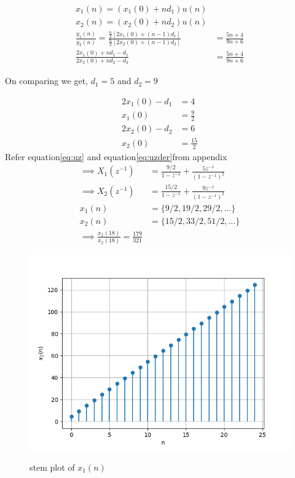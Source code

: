 \documentclass[a4,12pt,onecolumn]{IEEEtran}
\begin{document}
\begin{align}
x_1(n)=(x_1(0)+nd_1)u(n)
\label{ncert_11.9.2.9:1}\\
x_2(n)=(x_2(0)+nd_2)u(n)
\label{ncert_11.9.2.9:2}\\
\frac{y_1(n)}{y_2(n)}=\frac{\frac{n}{2}\left[ 2x_1(0) +(n-1)d_1 \right]}{\frac{n}{2}\left[ 2x_2(0) +(n-1)d_2 \right]}&= \frac{5n+4}{9n+6}\\
\frac{2x_1(0) +nd_1-d_1}{2x_2(0) +nd_2-d_2 }&= \frac{5n+4}{9n+6}
\end{align}
\begin{center}
On comparing we get, $ d_1 = 5 $ and $ d_2 = 9$ \\
\end{center}
\begin{align}
2x_1(0) - d_1 &= 4\\
x_1(0) &=\frac{9}{2}\\
2x_2(0)- d_2&=6\\
x_2(0) &=\frac{15}{2}
\end{align}
Refer equation\eqref{eq:uz}  and equation\eqref{eq:uzder}from appendix
\begin{align}
   \implies X_1(z^{-1}) &=\frac{9/2}{1-z^{-1}} + \frac{ 5z^{-1}}{(1-z^{-1})^2}\\
    \implies X_2(z^{-1})&= \frac{15/2}{1-z^{-1}} + \frac{9z^{-1}}{(1-z^{-1})^2}\\
x_1(n)&= \lbrace 9/2,19/2,29/2,...\rbrace \\
x_2(n)&= \lbrace 15/2,33/2,51/2,...\rbrace \\
\implies \frac{x_1(18)}{x_2(18)}=\frac{179}{321}
\end{align}
\begin{figure}[h!]
	\centering
	\includegraphics[width=\columnwidth]{ncert-maths/11/9/2/9/figs/fig1.png}
	\label{fig:plot}
	\caption{\large{stem plot of $x_1(n)$}}
\end{figure}
\end{document}
